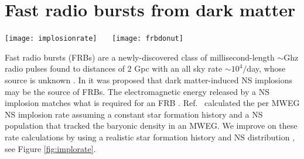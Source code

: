 \documentclass[nofootinbib,longbibliography,prd,floatfix,superscriptaddress,twocolumn]{revtex4-1}
\begin{document}
\section{Fast radio bursts from dark matter}
\label{sec:frbs}
\begin{figure*}[t!]
\texttt{[image: implosionrate]}~~~
\texttt{[image: frbdonut]}
\caption{\emph{Left}: The NS implosion rate in a Milky Way equivalent galaxy for dark matter that implodes NSs in time $t_{\rm c}$ for background dark matter density $\rho_{\rm x} $ with velocity dispersion $v_{\rm x}$ expressed in units of $\rho_{\rm x} t_{\rm c} / v_{\rm x}$. The dotted lines indicate high, median, and low fast radio burst rate estimates from surveys \cite{Rane:2015sxa,Wiel:2016pdl}. Implosion rates are shown for $10^8$ and $10^9$ NSs with a 1B* spatial distribution \cite{2010A&A...510A..23S}. \emph{Right}: Number of fast radio bursts, localized to $\sim 1 {~ \rm kpc}$ in a host galaxy, required to test whether fast radio bursts originate from NS-imploding dark matter, against the hypothesis that FRBs come from a non-imploding population of NSs, at $2 \sigma$ significance. }
\label{fig:implorate}
\end{figure*}
Fast radio bursts (FRBs) are a newly-discovered class of millisecond-length $\sim$Ghz radio pulses found to distances of 2 Gpc with an all sky rate $\sim 10^4/$day, whose source is unknown \cite{Lorimer:2007qn,Thornton:2013iua}. In \cite{Fuller:2014rza} it was proposed that dark matter-induced NS implosions may be the source of FRBs. The electromagnetic energy released by a NS implosion matches what is required for an FRB \cite{Palenzuela:2012my,Dionysopoulou:2012zv,Falcke:2013xpa}. Ref.~\cite{Fuller:2014rza} calculated the per MWEG NS implosion rate assuming a constant star formation history and a NS population that tracked the baryonic density in an MWEG. We improve on these rate calculations by using a realistic star formation history \cite{Hopkins:2006bw} and NS distribution \cite{2010A&A...510A..23S}, see Figure \ref{fig:implorate}.
\end{document}
